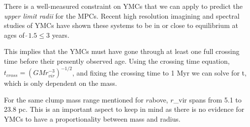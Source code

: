 There is a well-measured constraint on YMCs that we can apply to predict the \textit{upper limit radii} for the MPCs. Recent high resolution imagining and spectral studies of YMCs have shown these systems to be in or close to equilibrium at ages of  $\tilde~ 1.5 \leq 3$ years. \cite{Darwin_1900}

This implies that the YMCs must have gone through at least one full crossing time before their presently observed age. Using the crossing time equation, $t_{cross}=(GMr^{-3}_{vir})^{−1/2}$, and fixing the crossing time to 1 Myr we can solve for t, which is only dependent on the mass. \cite{1999}

For the same clump mass range mentioned for $r$\Omega above, $r$_{vir} spans from 5.1 to 23.8 pc. This is an important aspect to keep in mind as there is no evidence for YMCs to have a proportionality between mass and radius. \cite{Bedini_2013}